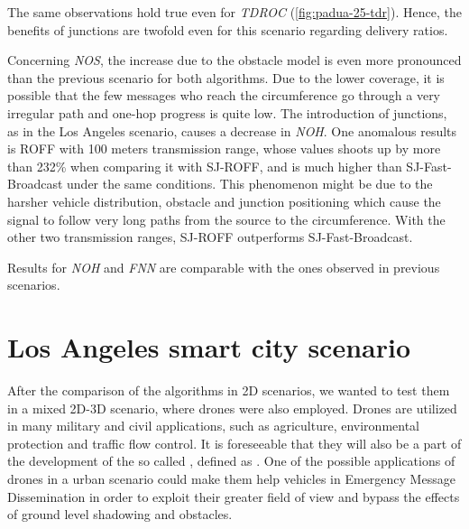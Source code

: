 		
		The same observations hold true even for \textit{TDROC} (\ref{fig:padua-25-tdr}). Hence, the benefits of junctions are twofold even for this scenario regarding delivery ratios.
		
		
		Concerning \textit{NOS}, the increase due to the obstacle model is even more pronounced than the previous scenario for both algorithms. Due to the lower coverage, it is possible that the few messages who reach the circumference go through a very irregular path and  one-hop progress is quite low. The introduction of junctions, as in the Los Angeles scenario, causes a decrease in \textit{NOH}. One anomalous results is ROFF with 100 meters transmission range, whose values shoots up by more than 232\% when comparing it with SJ-ROFF, and is much higher than SJ-Fast-Broadcast under the same conditions. This phenomenon might be due to the harsher vehicle distribution, obstacle and junction positioning which cause the signal to follow very long paths from the source to the circumference. With the other two transmission ranges, SJ-ROFF outperforms SJ-Fast-Broadcast.
		
		
		Results for \textit{NOH} and \textit{FNN} are comparable with the ones observed in previous scenarios.
		
		
	\section{Los Angeles smart city scenario}
		After the comparison of the algorithms in 2D scenarios, we wanted to test them in a mixed 2D-3D scenario, where drones were also employed. Drones are utilized in many military and civil applications, such as agriculture, environmental protection and traffic flow control. It is foreseeable that they will also be a part of the development of the so called , defined as \cite{smartCity}. One of the possible applications of drones in a urban scenario could make them help vehicles in Emergency Message Dissemination in order to exploit their greater field of view and bypass the effects of ground level shadowing and obstacles. 
		
